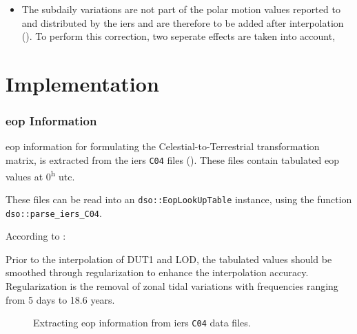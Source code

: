 \begin{itemize}
    \item The subdaily variations are not part of the polar motion values 
    reported to and distributed by the \gls{iers} and are therefore to be 
    added after interpolation (\cite{iers2010}). To perform this correction, 
    two seperate effects are taken into account,
\end{itemize}

\section{Implementation}
\label{eop-implementation}

\subsubsection{\gls{eop} Information}
\Gls{eop} information for formulating the Celestial-to-Terrestrial transformation 
matrix, is extracted from the \gls{iers} \texttt{C04} files (\cite{Bizouard2019}).
These files contain tabulated \gls{eop} values at 0\textsuperscript{h} \gls{utc}. 

These files can be read into an \texttt{dso::EopLookUpTable} instance, using 
the function \texttt{dso::parse\_iers\_C04}.

According to \cite{Bradley2016850}:
\begin{displayquote}
    Prior to the interpolation of DUT1 and LOD, the tabulated values
    should be smoothed through regularization to enhance the
    interpolation accuracy. Regularization is the removal of
    zonal tidal variations with frequencies ranging from 5 days
    to 18.6 years.
\end{displayquote}


\begin{figure}
\centering

\caption{Extracting \gls{eop} information from \gls{iers} \texttt{C04} data files.}
\label{fig:handling-eop}
\end{figure}